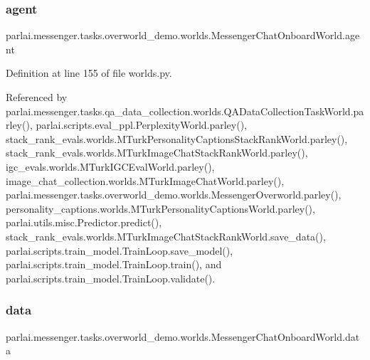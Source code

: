 \subsubsection{\texorpdfstring{agent}{agent}}
{\footnotesize\ttfamily parlai.\+messenger.\+tasks.\+overworld\+\_\+demo.\+worlds.\+Messenger\+Chat\+Onboard\+World.\+agent}



Definition at line 155 of file worlds.\+py.



Referenced by parlai.\+messenger.\+tasks.\+qa\+\_\+data\+\_\+collection.\+worlds.\+Q\+A\+Data\+Collection\+Task\+World.\+parley(), parlai.\+scripts.\+eval\+\_\+ppl.\+Perplexity\+World.\+parley(), stack\+\_\+rank\+\_\+evals.\+worlds.\+M\+Turk\+Personality\+Captions\+Stack\+Rank\+World.\+parley(), stack\+\_\+rank\+\_\+evals.\+worlds.\+M\+Turk\+Image\+Chat\+Stack\+Rank\+World.\+parley(), igc\+\_\+evals.\+worlds.\+M\+Turk\+I\+G\+C\+Eval\+World.\+parley(), image\+\_\+chat\+\_\+collection.\+worlds.\+M\+Turk\+Image\+Chat\+World.\+parley(), parlai.\+messenger.\+tasks.\+overworld\+\_\+demo.\+worlds.\+Messenger\+Overworld.\+parley(), personality\+\_\+captions.\+worlds.\+M\+Turk\+Personality\+Captions\+World.\+parley(), parlai.\+utils.\+misc.\+Predictor.\+predict(), stack\+\_\+rank\+\_\+evals.\+worlds.\+M\+Turk\+Image\+Chat\+Stack\+Rank\+World.\+save\+\_\+data(), parlai.\+scripts.\+train\+\_\+model.\+Train\+Loop.\+save\+\_\+model(), parlai.\+scripts.\+train\+\_\+model.\+Train\+Loop.\+train(), and parlai.\+scripts.\+train\+\_\+model.\+Train\+Loop.\+validate().

\mbox{\label{classparlai_1_1messenger_1_1tasks_1_1overworld__demo_1_1worlds_1_1MessengerChatOnboardWorld_a9b27859dcdc31344fba8c6079bf3cd3c}} 
\subsubsection{\texorpdfstring{data}{data}}
{\footnotesize\ttfamily parlai.\+messenger.\+tasks.\+overworld\+\_\+demo.\+worlds.\+Messenger\+Chat\+Onboard\+World.\+data}



